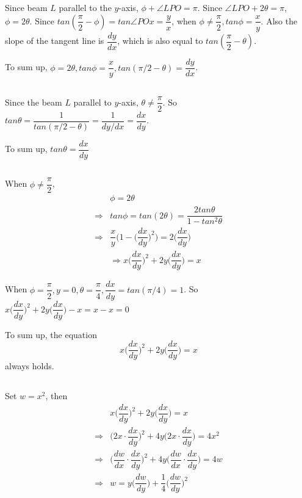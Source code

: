 \documentclass[a4paper,12pt,titlepage]{article}
\begin{document}
\subsection{}
Since beam $L$ parallel to the $y$-axis, $\phi+\angle LPO=\pi$. Since $\angle LPO+2\theta=\pi$, $\phi=2\theta$. Since $tan(\dfrac{\pi}{2}-\phi)=tan\angle POx=\dfrac{y}{x} $, when $\phi\neq\dfrac{\pi}{2},tan\phi=\dfrac{x}{y}$. Also the slope of the tangent line is $\dfrac{dy}{dx}$, which is also equal to $tan(\dfrac{\pi}{2}-\theta)$.

To sum up, $\phi=2\theta,tan\phi=\dfrac{x}{y},tan(\pi/2-\theta)=\dfrac{dy}{dx}$.

\subsection{}
Since the beam $L$ parallel to $y$-axis, $\theta\neq\dfrac{\pi}{2}$. So $tan\theta=\dfrac{1}{tan(\pi/2-\theta)}=\dfrac{1}{dy/dx}=\dfrac{dx}{dy}$.

To sum up, $tan\theta=\dfrac{dx}{dy}$

\subsection{}
When $\phi\neq\dfrac{\pi}{2}$,
\begin{align*}
&\phi=2\theta\\
\Rightarrow&tan\phi=tan(2\theta)=\dfrac{2tan\theta}{1-tan^2\theta}\\
\Rightarrow&\dfrac{x}{y}\Big(1-\Big(\dfrac{dx}{dy}\Big)^2\Big)=2\Big(\dfrac{dx}{dy}\Big)\\
&\Rightarrow x\Big(\dfrac{dx}{dy}\Big)^2+2y\Big(\dfrac{dx}{dy}\Big)=x
\end{align*}

When $\phi=\dfrac{\pi}{2},y=0,\theta=\dfrac{\pi}{4},\dfrac{dx}{dy}=tan(\pi/4)=1$. So $x\Big(\dfrac{dx}{dy}\Big)^2+2y\Big(\dfrac{dx}{dy}\Big)-x=x-x=0$

To sum up, the equation 
$$x\Big(\dfrac{dx}{dy}\Big)^2+2y\Big(\dfrac{dx}{dy}\Big)=x$$
always holds.


\subsection{}
Set $w=x^2$, then
\begin{align*}
&x\Big(\dfrac{dx}{dy}\Big)^2+2y\Big(\dfrac{dx}{dy}\Big)=x\\
\Rightarrow&\Big(2x\cdot \dfrac{dx}{dy}\Big)^2+4y\Big(2x\cdot \dfrac{dx}{dy}\Big)=4x^2\\
\Rightarrow&\Big(\dfrac{dw}{dx}\cdot \dfrac{dx}{dy}\Big)^2+4y\Big(\dfrac{dw}{dx}\cdot \dfrac{dx}{dy}\Big)=4w\\
\Rightarrow&w=y\Big(\dfrac{dw}{dy}\Big)+\dfrac{1}{4}\Big(\dfrac{dw}{dy}\Big)^2\\
\end{align*}
 
\end{document}
